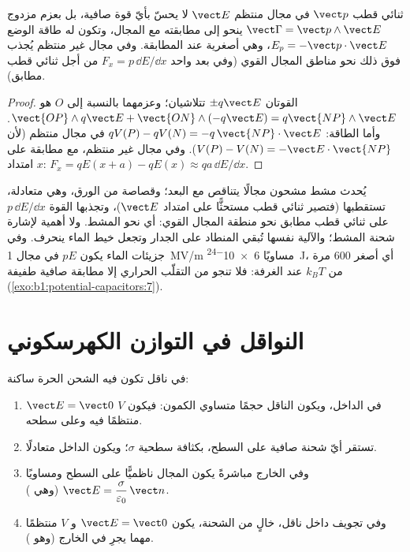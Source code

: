 \begin{proposition}\label{prop:b1:potential-capacitors:dipoleinfield}
ثنائي قطب $\vect p$ في مجال منتظم $\vect E$ لا يحسّ بأيّ قوة صافية، بل
بعزم مزدوج $\vect\Gamma = \vect p\wedge\vect E$ ينحو إلى مطابقته مع
المجال، وتكون له طاقة الوضع $E_p = -\vect p\cdot\vect E$،
وهي أصغرية عند المطابقة. وفي مجال غير منتظم يُجذب فوق ذلك
نحو مناطق المجال القوي (وفي بعد واحد $F_x = p\,\dd E/\dd x$
من أجل ثنائي قطب مطابق).
\end{proposition}

\begin{proof}
القوتان $\pm q\vect E$ تتلاشيان؛ وعزمهما بالنسبة إلى $O$ هو $\vect{OP}\wedge
q\vect E + \vect{ON}\wedge(-q\vect E) = q\vect{NP}\wedge\vect E$. وأما الطاقة:
$qV(P) - qV(N) = -q\,\vect{NP}\cdot\vect E$ في مجال منتظم (لأن $V(P)
- V(N) = -\vect E\cdot\vect{NP}$). وفي مجال غير منتظم، مع مطابقة على امتداد $x$: $F_x =
qE(x + a) - qE(x) \approx qa\,\dd E/\dd x$.
\end{proof}

\begin{example}\label{ex:b1:potential-capacitors:comb}
يُحدث مشط مشحون مجالًا يتناقص مع البعد؛ وقصاصة من
الورق، وهي متعادلة، تستقطبها (فتصير ثنائي قطب مستحثًّا على امتداد $\vect E$)،
وتجذبها القوة $p\,\dd E/\dd x$ على ثنائي قطب مطابق نحو
منطقة المجال القوي: أي نحو المشط. ولا أهمية لإشارة شحنة المشط؛
والآلية نفسها تُبقي المنطاد على الجدار وتجعل
خيط الماء ينحرف. وفي جزيئات الماء يكون $pE$ في مجال \qty{1}{MV/m}
مساويًا \qty{6e-24}{J}، أي أصغر $600$ مرة من $k_BT$ عند  الغرفة:
فلا تنجو من التقلّب الحراري إلا مطابقة صافية طفيفة
(\cref{exo:b1:potential-capacitors:7}).
\end{example}

\section{النواقل في التوازن الكهرسكوني}

\begin{theorem}\label{thm:b1:potential-capacitors:conductor}
في ناقل تكون فيه الشحن الحرة ساكنة:
\begin{enumerate}
  \item $\vect E = \vect 0$ في الداخل، ويكون الناقل حجمًا متساوي
        الكمون: فيكون $V$ منتظمًا فيه وعلى سطحه.
  \item تستقر أيّ شحنة صافية على السطح، بكثافة سطحية
        $\sigma$؛ ويكون الداخل متعادلًا.
  \item وفي الخارج مباشرةً يكون المجال ناظميًّا على السطح ومساويًا
        $\vect E = \dfrac{\sigma}{\varepsilon_0}\,\vect n$ (وهي \emph{}).
  \item وفي تجويف داخل ناقل، خالٍ من الشحنة، يكون $\vect E =
        \vect 0$ و $V$ منتظمًا مهما يجرِ في الخارج (وهو \emph{}).
\end{enumerate}
\end{theorem}

